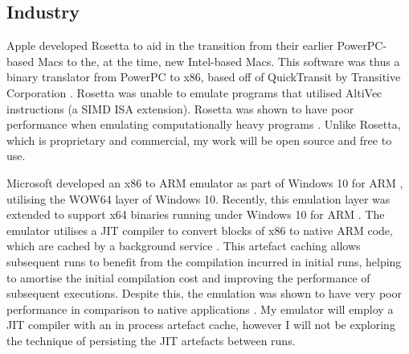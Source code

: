 \subsection{Industry}
\label{section:background-industry}

Apple developed Rosetta \cite{apple-rosetta} to aid in the transition from their earlier PowerPC-based Macs to the, at the time, new Intel-based Macs. This software was thus a binary translator from PowerPC to x86, based off of QuickTransit by Transitive Corporation \cite{cnet-rosetta}. Rosetta was unable to emulate programs that utilised AltiVec instructions (a SIMD ISA extension). Rosetta was shown to have poor performance when emulating computationally heavy programs \cite{rosetta-perf}. Unlike Rosetta, which is proprietary and commercial, my work will be open source and free to use.

Microsoft developed an x86 to ARM emulator as part of Windows 10 for ARM \cite{docs-win10-arm-emu}, utilising the WOW64 \cite{WOW64} layer of Windows 10. Recently, this emulation layer was extended to support x64 binaries running under Windows 10 for ARM \cite{win10-arm-x64-emu}. The emulator utilises a JIT compiler to convert blocks of x86 to native ARM code, which are cached by a background service \cite{docs-win10-arm-emu, blackberry-win10-arm-emu}. This artefact caching allows subsequent runs to benefit from the compilation incurred in initial runs, helping to amortise the initial compilation cost and improving the performance of subsequent executions. Despite this, the emulation was shown to have very poor performance in comparison to native applications \cite{win10-arm-x64-emu-perf1, win10-arm-x64-emu-perf2}. My emulator will employ a JIT compiler with an in process artefact cache, however I will not be exploring the technique of persisting the JIT artefacts between runs.

